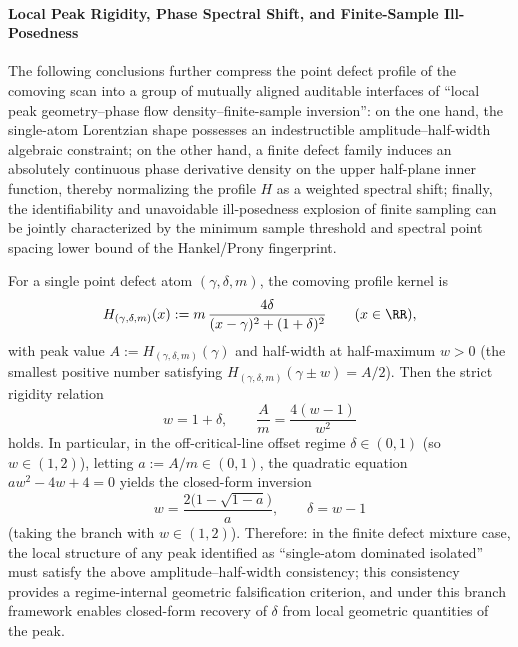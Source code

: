 





\paragraph{Local Peak Rigidity, Phase Spectral Shift, and Finite-Sample Ill-Posedness}
The following conclusions further compress the point defect profile of the comoving scan into a group of mutually aligned auditable interfaces of ``local peak geometry--phase flow density--finite-sample inversion'': on the one hand, the single-atom Lorentzian shape possesses an indestructible amplitude--half-width algebraic constraint; on the other hand, a finite defect family induces an absolutely continuous phase derivative density on the upper half-plane inner function, thereby normalizing the profile \(H\) as a weighted spectral shift; finally, the identifiability and unavoidable ill-posedness explosion of finite sampling can be jointly characterized by the minimum sample threshold and spectral point spacing lower bound of the Hankel/Prony fingerprint.

\begin{proposition}\label{con:xi-lorentzian-amplitude-width-rigidity}
For a single point defect atom \((\gamma,\delta,m)\), the comoving profile kernel is
\[
H_{(\gamma,\delta,m)}(x)
:=
m\,\frac{4\delta}{(x-\gamma)^2+(1+\delta)^2}\qquad(x\in\RR),
\]
with peak value
\(
A:=H_{(\gamma,\delta,m)}(\gamma)
\)
and half-width at half-maximum \(w>0\) (the smallest positive number satisfying \(H_{(\gamma,\delta,m)}(\gamma\pm w)=A/2\)).
Then the strict rigidity relation
\[
\boxed{\;
w=1+\delta,\qquad
\frac{A}{m}=\frac{4(w-1)}{w^2}\; }
\]
holds. In particular, in the off-critical-line offset regime \(\delta\in(0,1)\) (so \(w\in(1,2)\)), letting \(a:=A/m\in(0,1)\), the quadratic equation \(aw^2-4w+4=0\) yields the closed-form inversion
\[
\boxed{\;
w=\frac{2\bigl(1-\sqrt{1-a}\bigr)}{a},\qquad
\delta=w-1\;}
\]
(taking the branch with \(w\in(1,2)\)).
Therefore: in the finite defect mixture case, the local structure of any peak identified as ``single-atom dominated isolated'' must satisfy the above amplitude--half-width consistency; this consistency provides a regime-internal geometric falsification criterion, and under this branch framework enables closed-form recovery of \(\delta\) from local geometric quantities of the peak.
\end{proposition}

